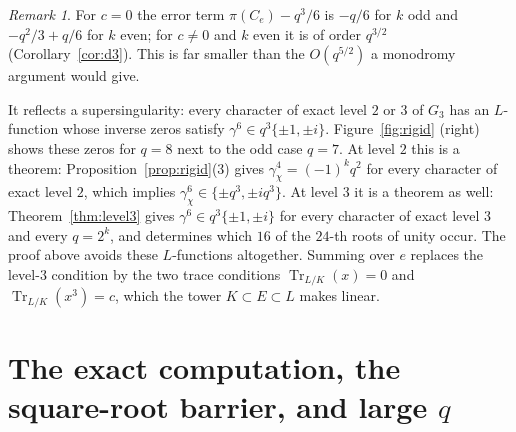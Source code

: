 \documentclass[11pt,a4paper]{amsart}
\theoremstyle{definition}
\theoremstyle{remark}
\newtheorem{remark}[theorem]{Remark}
\newcommand{\Tr}{\operatorname{Tr}}
\begin{document}


\begin{remark}\label{rem:super}
For $c=0$ the error term $\pi(C_e)-q^3/6$ is $-q/6$ for $k$ odd and $-q^2/3+q/6$ for $k$ even; for $c\ne0$ and $k$ even it is of order $q^{3/2}$ (Corollary~\ref{cor:d3}). This is far smaller than the
$O(q^{5/2})$ a monodromy argument would give.

It reflects a supersingularity: every character of exact level $2$ or $3$
of $G_3$ has an $L$-function whose inverse zeros satisfy $\gamma^6\in q^3\{\pm1,\pm i\}$. Figure~\ref{fig:rigid} (right) shows these zeros for $q=8$ next to the odd case $q=7$. At level $2$ this is a
theorem: Proposition~\ref{prop:rigid}(3) gives $\gamma_\chi^4=(-1)^kq^2$ for every character of exact level $2$,
which implies $\gamma_\chi^6\in\{\pm q^3,\pm iq^3\}$. At level $3$ it is a theorem as well: Theorem~\ref{thm:level3} gives $\gamma^6\in q^3\{\pm1,\pm i\}$ for every character of exact level $3$ and every $q=2^k$, and determines which $16$ of the $24$-th roots of unity occur. The proof above avoids
these $L$-functions altogether. Summing over $e$ replaces the level-$3$ condition by the two trace conditions
$\Tr_{L/K}(x)=0$ and $\Tr_{L/K}(x^3)=c$, which the tower $K\subset E\subset L$ makes linear.
\end{remark}


\FloatBarrier

\section{The exact computation, the square-root barrier, and large \texorpdfstring{$q$}{q}}\label{sec:comp}
\end{document}
